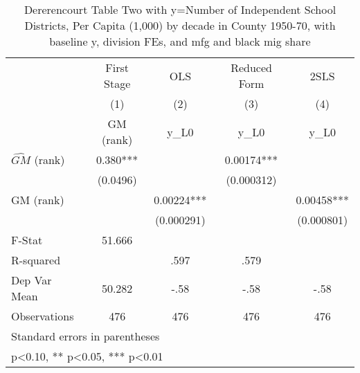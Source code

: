 \begin{table}[htbp]\centering
\def\sym#1{\ifmmode^{#1}\else\(^{#1}\)\fi}
\caption{Dererencourt Table Two with y=Number of Independent School Districts, Per Capita (1,000) by decade in County 1950-70, with baseline y, division FEs, and mfg and black mig share}
\begin{tabular}{l*{4}{c}}
\toprule
                    & First Stage   &         OLS   &Reduced Form   &        2SLS   \\
                    &\multicolumn{1}{c}{(1)}&\multicolumn{1}{c}{(2)}&\multicolumn{1}{c}{(3)}&\multicolumn{1}{c}{(4)}\\
                    &\multicolumn{1}{c}{GM  (rank)}&\multicolumn{1}{c}{y\_L0}&\multicolumn{1}{c}{y\_L0}&\multicolumn{1}{c}{y\_L0}\\
\midrule
$\hat{GM}$ (rank)   &       0.380***&               &     0.00174***&               \\
                    &    (0.0496)   &               &  (0.000312)   &               \\
\addlinespace
GM  (rank)          &               &     0.00224***&               &     0.00458***\\
                    &               &  (0.000291)   &               &  (0.000801)   \\
\midrule
F-Stat              &      51.666   &               &               &               \\
R-squared           &               &        .597   &        .579   &               \\
Dep Var Mean        &      50.282   &        -.58   &        -.58   &        -.58   \\
Observations        &         476   &         476   &         476   &         476   \\
\bottomrule
\multicolumn{5}{l}{\footnotesize Standard errors in parentheses}\\
\multicolumn{5}{l}{\footnotesize * p<0.10, ** p<0.05, *** p<0.01}\\
\end{tabular}
\end{table}
